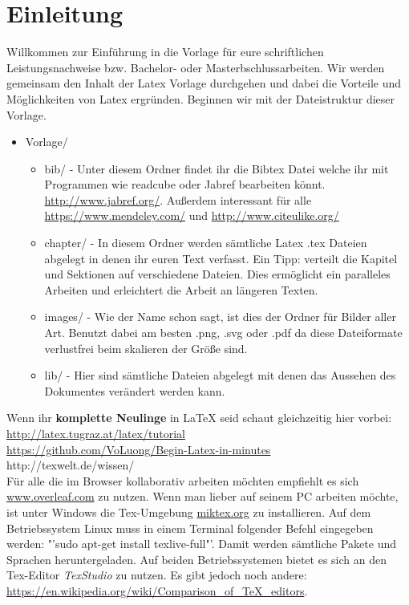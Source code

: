 \chapter{Einleitung}
Willkommen zur Einführung in die Vorlage für eure schriftlichen Leistungsnachweise bzw. Bachelor- oder Masterbschlussarbeiten. Wir werden gemeinsam den Inhalt der Latex Vorlage durchgehen und dabei die Vorteile und Möglichkeiten von Latex ergründen. Beginnen wir mit der Dateistruktur dieser Vorlage.

\begin{itemize}
	\item Vorlage/
		\begin{itemize}
			\item bib/ - Unter diesem Ordner findet ihr die Bibtex Datei welche ihr mit Programmen wie readcube oder Jabref bearbeiten könnt. \url{http://www.jabref.org/}. Außerdem interessant für alle \url{https://www.mendeley.com/} und \url{http://www.citeulike.org/}
			\item chapter/ - In diesem Ordner werden sämtliche Latex .tex Dateien abgelegt in denen ihr euren Text verfasst. Ein Tipp: verteilt die Kapitel und Sektionen auf verschiedene Dateien. Dies ermöglicht ein paralleles Arbeiten und erleichtert die Arbeit an längeren Texten.
			\item images/ - Wie der Name schon sagt, ist dies der Ordner für Bilder aller Art. Benutzt dabei am besten .png, .svg oder .pdf da diese Dateiformate verlustfrei beim skalieren der Größe sind.
			\item lib/ - Hier sind sämtliche Dateien abgelegt mit denen das Aussehen des Dokumentes verändert werden kann. 
		\end{itemize}
\end{itemize}

Wenn ihr \textbf{komplette Neulinge} in LaTeX seid schaut gleichzeitig hier vorbei: \\\url{http://latex.tugraz.at/latex/tutorial}\\
\url{https://github.com/VoLuong/Begin-Latex-in-minutes}\\
http://texwelt.de/wissen/\\
Für alle die im Browser kollaborativ arbeiten möchten empfiehlt es sich \url{www.overleaf.com} zu nutzen. Wenn man lieber auf seinem PC arbeiten möchte, ist unter Windows die Tex-Umgebung \url{miktex.org} zu installieren. Auf dem Betriebssystem Linux muss in einem Terminal folgender Befehl eingegeben werden: "'sudo apt-get install texlive-full"'. Damit werden sämtliche Pakete und Sprachen heruntergeladen. Auf beiden Betriebssystemen bietet es sich an den Tex-Editor \emph{TexStudio} zu nutzen. Es gibt jedoch noch andere: \url{https://en.wikipedia.org/wiki/Comparison_of_TeX_editors}.

